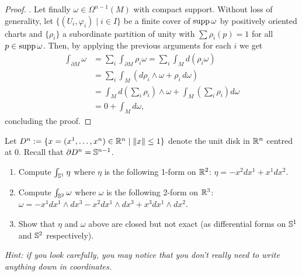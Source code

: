 \begin{proof}
  .
  Let finally $\omega\in\Omega^{n-1}(M)$ with compact support.
  Without loss of generality, let $\{(U_i, \varphi_i)\mid i\in I\}$ be a finite cover of $\operatorname{supp} \omega$ by positively oriented charts and $\{\rho_i\}$ a subordinate partition of unity with $\sum \rho_i(p) = 1$ for all $p\in\operatorname{supp} \omega$.
  Then, by applying the previous arguments for each $i$ we get
  \begin{align}
    \int_{\partial M} \omega
    &= \sum_i \int_{\partial M} \rho_i\omega
     = \sum_i \int_M d(\rho_i \omega) \\
    &= \sum_i \int_M (d\rho_i \wedge\omega + \rho_i\, d\omega) \\
    &= \int_M d\left(\sum_i \rho_i\right)\wedge\omega + \int_M \left(\sum_i \rho_i\right) d\omega \\ 
    &= 0 + \int_M d\omega,
  \end{align}
  concluding the proof.
\end{proof}

\begin{exercise}
  Let $D^n := \{x=(x^1, \ldots, x^n)\in\mathbb{R}^n \mid \|x\| \leq 1\}$ denote the unit disk in $\mathbb{R}^n$ centred at $0$. Recall that $\partial D^n = \mathbb{S}^{n-1}$.
  \begin{enumerate}
    \item Compute $\int_{\mathbb{S}^1} \eta$ where $\eta$ is the following 1-form on $\mathbb{R}^2$: $\eta = -x^2 dx^1 + x^1 dx^2$.
    \item Compute $\int_{\mathbb{S}^2} \omega$ where $\omega$ is the following 2-form on $\mathbb{R}^3$: $\omega = -x^1 dx^1\wedge dx^3 - x^2 dx^1\wedge dx^3 + x^3 dx^1\wedge dx^2$.
    \item Show that $\eta$ and $\omega$ above are closed but not exact (as differential forms on $\mathbb{S}^1$ and $\mathbb{S}^2$ respectively).
  \end{enumerate}
  \textit{\small Hint: if you look carefully, you may notice that you don't really need to write anything down in coordinates.}
\end{exercise}

